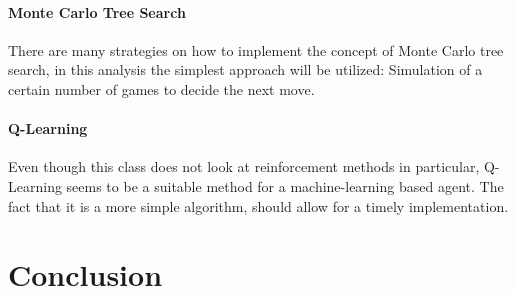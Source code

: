 \documentclass{llncs}
\begin{document}
\paragraph{Monte Carlo Tree Search}
There are many strategies on how to implement the concept of Monte Carlo tree search, in this analysis the simplest approach will be utilized: Simulation of a certain number of games to decide the next move.

\paragraph{Q-Learning}
Even though this class does not look at reinforcement methods in particular, Q-Learning seems to be a suitable method for a machine-learning based agent. The fact that it is a more simple algorithm, should allow for a timely implementation.

\section{Conclusion}



\end{document}
